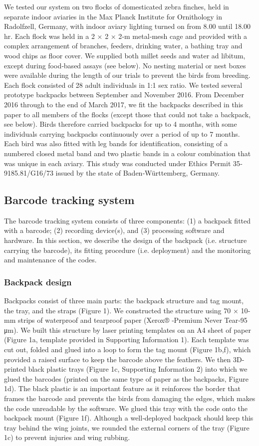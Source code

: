\documentclass[11pt,a4paper,oneside]{book}
\begin{document}
We tested our system on two flocks of domesticated zebra finches, held in separate indoor aviaries in the Max Planck Institute for Ornithology in Radolfzell, Germany, with indoor aviary lighting turned on from 8.00 until 18.00 hr. Each flock was held in a 2 × 2 × 2‐m metal‐mesh cage and provided with a complex arrangement of branches, feeders, drinking water, a bathing tray and wood chips as floor cover. We supplied both millet seeds and water ad libitum, except during food‐based assays (see below). No nesting material or nest boxes were available during the length of our trials to prevent the birds from breeding. Each flock consisted of 28 adult individuals in 1:1 sex ratio. We tested several prototype backpacks between September and November 2016. From December 2016 through to the end of March 2017, we fit the backpacks described in this paper to all members of the flocks (except those that could not take a backpack, see below). Birds therefore carried backpacks for up to 4 months, with some individuals carrying backpacks continuously over a period of up to 7 months. Each bird was also fitted with leg bands for identification, consisting of a numbered closed metal band and two plastic bands in a colour combination that was unique in each aviary. This study was conducted under Ethics Permit 35‐9185.81/G16/73 issued by the state of Baden‐Württemberg, Germany.

\subsection{Barcode tracking system}
The barcode tracking system consists of three components: (1) a backpack fitted with a barcode; (2) recording device(s), and (3) processing software and hardware. In this section, we describe the design of the backpack (i.e. structure carrying the barcode), its fitting procedure (i.e. deployment) and the monitoring and maintenance of the codes.

\subsubsection{Backpack design}
Backpacks consist of three main parts: the backpack structure and tag mount, the tray, and the straps (Figure 1). We constructed the structure using 70 × 10‐mm strips of waterproof and tearproof paper (Xerox® ‐Premium Never Tear‐95 μm). We built this structure by laser printing templates on an A4 sheet of paper (Figure 1a, template provided in Supporting Information 1). Each template was cut out, folded and glued into a loop to form the tag mount (Figure 1b,f), which provided a raised surface to keep the barcode above the feathers. We then 3D‐printed black plastic trays (Figure 1c, Supporting Information 2) into which we glued the barcodes (printed on the same type of paper as the backpacks, Figure 1d). The black plastic is an important feature as it reinforces the border that frames the barcode and prevents the birds from damaging the edges, which makes the code unreadable by the software. We glued this tray with the code onto the backpack mount (Figure 1f). Although a well‐deployed backpack should keep this tray behind the wing joints, we rounded the external corners of the tray (Figure 1c) to prevent injuries and wing rubbing.
\end{document}
